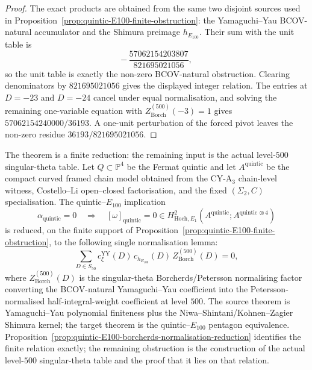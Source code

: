 \begin{proof}
The exact products are obtained from the same two disjoint sources used in
Proposition~\ref{prop:quintic-E100-finite-obstruction}: the
Yamaguchi--Yau BCOV-natural accumulator and the Shimura preimage
$h_{E_{100}}$. Their sum with the unit table is
\[
 -\,\frac{57062154203807}{821695021056},
\]
so the unit table is exactly the non-zero BCOV-natural obstruction.
Clearing denominators by $821695021056$ gives the displayed integer
relation. The entries at $D=-23$ and $D=-24$ cancel under equal
normalisation, and solving the remaining one-variable equation with
$Z_{\mathrm{Borch}}^{(500)}(-3)=1$ gives
$57062154240000/36193$. A one-unit perturbation of the forced pivot
leaves the non-zero residue
$36193/821695021056$.
\end{proof}

\begin{theorem}
\label{thm:quintic-E100-first-missing-lemma}
The theorem is a finite reduction: the remaining input is the actual
level-$500$ singular-theta table.
Let $Q\subset \mathbb{P}^4$ be the Fermat quintic and let
$A^{\mathrm{quintic}}$ be the compact curved framed chain model obtained
from the CY-A$_3$ chain-level witness, Costello--Li open--closed
factorisation, and the fixed $(\Sigma_2,C)$ specialisation. The
quintic--$E_{100}$ implication
\[
 \alpha_{\mathrm{quintic}}=0
 \quad\Longrightarrow\quad
 [\omega]_{\mathrm{quintic}}=0\in
 H^2_{\mathrm{Hoch},E_1}
 (A^{\mathrm{quintic}};A^{\mathrm{quintic}\,\otimes 4})
\]
is reduced, on the finite support of
Proposition~\ref{prop:quintic-E100-finite-obstruction}, to
the following single normalisation lemma:
\[
 \sum_{D\in S_{50}}
 c_{\xi}^{\mathrm{YY}}(D)\,
 c_{h_{E_{100}}}(D)\,
 Z_{\mathrm{Borch}}^{(500)}(D)
 =0,
\]
where $Z_{\mathrm{Borch}}^{(500)}(D)$ is the singular-theta
Borcherds/Petersson normalising factor converting the BCOV-natural
Yamaguchi--Yau coefficient into the Petersson-normalised
half-integral-weight coefficient at level $500$. The source theorem is
Yamaguchi--Yau polynomial finiteness plus the Niwa--Shintani/Kohnen--Zagier
Shimura kernel; the target theorem is the quintic--$E_{100}$ pentagon
equivalence. Proposition~\ref{prop:quintic-E100-borcherds-normalisation-reduction}
identifies the finite relation exactly; the remaining obstruction is the
construction of the actual level-$500$ singular-theta table and the proof
that it lies on that relation.
\end{theorem}

